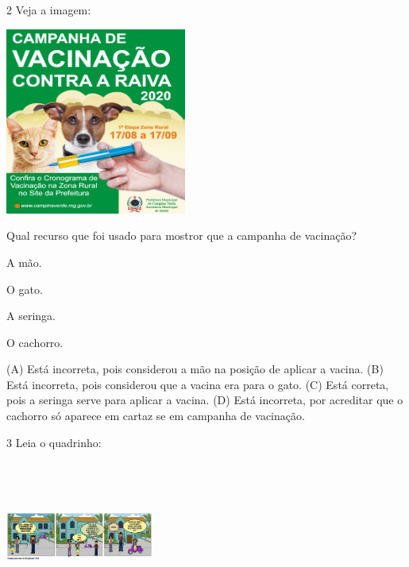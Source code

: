 \num{2} Veja a imagem:

\includegraphics[width=2.34507in,height=2.41801in]{media/image137.png}


Qual recurso que foi usado para mostror que a campanha de vacinação?

\begin{minipage}{.5\textwidth}
\begin{escolha}
\item A mão.

\item O gato.

\item A seringa.

\item O cachorro.
\end{escolha}
\end{minipage}

(A) Está incorreta, pois considerou a mão na posição de aplicar a vacina.
(B) Está incorreta, pois considerou que a vacina era para o gato.
(C) Está correta, pois a seringa serve para aplicar a vacina.
(D) Está incorreta, por acreditar que o cachorro só aparece em cartaz se
em campanha de vacinação.

\num{3} Leia o quadrinho:

\includegraphics[width=1.92014in,height=1.95486in]{media/image138.png}

